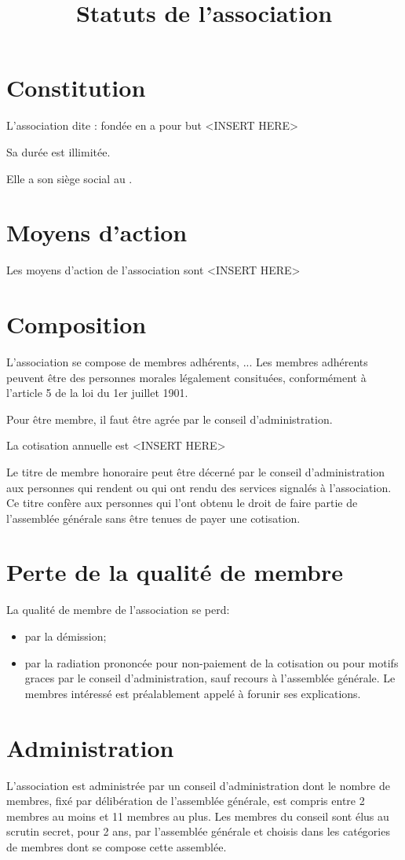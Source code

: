 \documentclass[a4paper,defaultorg]{organisation-contract}
\title{Statuts de l'association}
\begin{document}
\section{Constitution}
L'association dite : \og \orgshort{} \fg{}
fondée en \orgcreatedin{}
a pour but <INSERT HERE>

Sa durée est illimitée.

Elle a son siège social au \orgsinglelineaddress.

\section{Moyens d'action}
Les moyens d'action de l'association sont <INSERT HERE>

\section{Composition}
L'association se compose de membres adhérents, ... 
Les membres adhérents peuvent être des personnes morales légalement consituées,
conformément à l'article 5 de la loi du 1er juillet 1901.

Pour être membre, il faut être agrée par le conseil d'administration.

La cotisation annuelle est <INSERT HERE>


Le titre de membre honoraire peut être décerné par le conseil d'administration
aux personnes qui rendent ou qui ont rendu des services signalés à
l'association. Ce titre confère aux personnes qui l'ont obtenu le droit de faire
partie de l'assemblée générale sans être tenues de payer une cotisation.

\section{Perte de la qualité de membre}
La qualité de membre de l'association se perd:

\begin{itemize}
    \item par la démission;
    \item par la radiation prononcée pour non-paiement de la cotisation ou pour
        motifs graces par le conseil d'administration, sauf recours à
        l'assemblée générale. Le membres intéressé est préalablement appelé à
        forunir ses explications.
\end{itemize}

\section{Administration}
L'association est administrée par un conseil d'administration dont le nombre de
membres, fixé par délibération de l'assemblée générale, est compris entre 2
membres au moins et 11 membres au plus. Les membres du conseil sont élus au
scrutin secret, pour 2 ans, par l'assemblée générale et choisis dans les
catégories de membres dont se compose cette assemblée.
\end{document}

